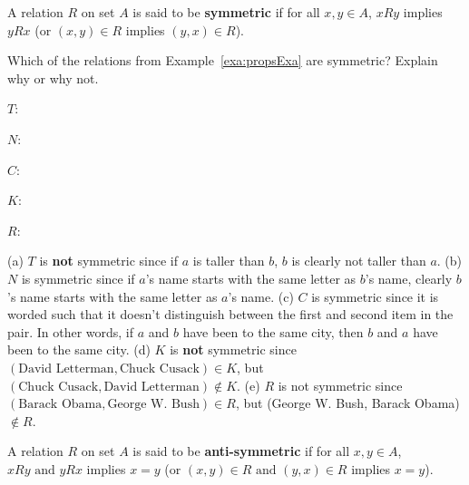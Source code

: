 \begin{df}
A relation $R$ on set $A$ is said to be
{\bf symmetric} if 
for all $x,y\in A$,
$x R y$ implies $y  R x$
(or $(x,y)\in R$ implies $(y,x)\in R$).
\end{df}


\begin{exer}
Which of the relations from Example~\ref{exa:propsExa} are symmetric?  Explain why or why not.
\begin{lenum}
\item $T$: \blanklinefill  

\blanklinefill
\item $N$: \blanklinefill 

\blanklinefill
\item $C$: \blanklinefill

\blanklinefill
\item $K$: \blanklinefill

\blanklinefill
\item $R$: \blanklinefill

\blanklinefill
\end{lenum}
\begin{answer}
(a) $T$ is {\bf not} symmetric since if $a$ is taller than $b$, $b$ is clearly not taller than $a$.
(b) $N$ is symmetric since if $a$'s name starts with the same letter as $b$'s name, clearly $b$'s name
starts with the same letter as $a$'s name.
(c) $C$ is symmetric since it is worded such that it doesn't distinguish between the first and second
item in the pair.  In other words, if $a$ and $b$ have been to the same city, then $b$ and $a$ have 
been to the same city.
(d) $K$ is {\bf not} symmetric since $(\mbox{David Letterman},\mbox{Chuck Cusack})\in K$, but
$(\mbox{Chuck Cusack},\mbox{David Letterman})\not\in K$.
(e) $R$ is not symmetric since $(\mbox{Barack Obama}, \mbox{George W. Bush})\in R$, but
(George W. Bush, Barack Obama)$\not\in R$.
\end{answer}
\end{exer}

\begin{df}
A relation $R$ on set $A$ is said to be
{\bf anti-symmetric} if
for all $x,y\in A$,
$x R y \mbox{ and } y  R x $ implies   $x = y$ 
(or $(x,y)\in R \mbox{ and }  (y,x)\in R$ implies $x=y$).
\end{df}


